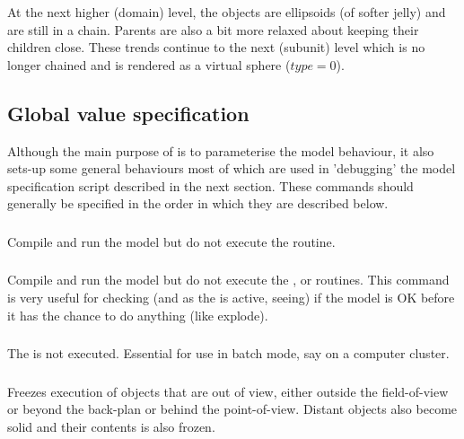 At the next higher (domain) level, the objects are ellipsoids (of softer jelly) and are still
in a chain.  Parents are also a bit more relaxed about keeping their children close.  These
trends continue to the next (subunit) level which is no longer chained and is rendered as a
virtual sphere ($type = 0$).
 

\subsection{Global value specification}

Although the main purpose of  is to parameterise the model behaviour, it also
sets-up some general behaviours most of which are used in 'debugging' the model specification
script described in the next section.   These commands should generally be specified in the
order in which they are described below.

\subsubsection{}

Compile and run the model but do not execute the  routine.

\subsubsection{}

Compile and run the model but do not execute the ,  or  routines.
This command is very useful for checking (and as the  is active, seeing) if the model 
is OK before it has the chance to do anything (like explode).

\subsubsection{}

The  is not executed.   Essential for use in batch mode, say on a computer cluster.

\subsubsection{}

Freezes execution of objects that are out of view, either outside the field-of-view or
beyond the back-plan or behind the point-of-view.   Distant objects also become solid and
their contents is also frozen.

